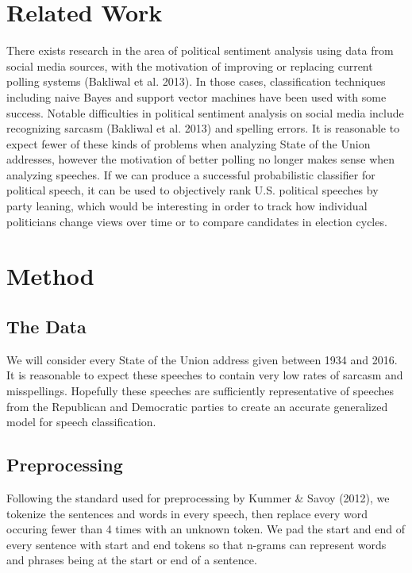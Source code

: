 \documentclass{amsart}
\theoremstyle{definition}
\theoremstyle{remark}
\numberwithin{equation}{section}
\begin{document}
\section{Related Work}
There exists research in the area of political sentiment analysis using data from social media sources, with the motivation of improving or replacing current polling systems (Bakliwal et al. 2013). In those cases, classification techniques including naive Bayes and support vector machines have been used with some success. Notable difficulties in political sentiment analysis on social media include recognizing sarcasm (Bakliwal et al. 2013) and spelling errors. It is reasonable to expect fewer of these kinds of problems when analyzing State of the Union addresses, however the motivation of better polling no longer makes sense when analyzing speeches. If we can produce a successful probabilistic classifier for political speech, it can be used to objectively rank U.S. political speeches by party leaning, which would be interesting in order to track how individual politicians change views over time or to compare candidates in election cycles.\\

\section{Method}
\subsection{The Data}
We will consider every State of the Union address given between 1934 and 2016. It is reasonable to expect these speeches to contain very low rates of sarcasm and misspellings. Hopefully these speeches are sufficiently representative of speeches from the Republican and Democratic parties to create an accurate generalized model for speech classification.\\
\subsection{Preprocessing}
Following the standard used for preprocessing by Kummer \& Savoy (2012), we tokenize the sentences and words in every speech, then replace every word occuring fewer than 4 times with an unknown token. We pad the start and end of every sentence with start and end tokens so that n-grams can represent words and phrases being at the start or end of a sentence.\\
\end{document}
